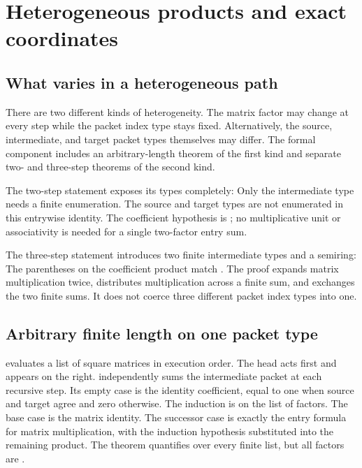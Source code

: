 \clearpage
\section{Heterogeneous products and exact coordinates}
\subsection{What varies in a heterogeneous path}
There are two different kinds of heterogeneity. The matrix factor may change at every step while the packet index type stays fixed. Alternatively, the source, intermediate, and target packet types themselves may differ. The formal component includes an arbitrary-length theorem of the first kind and separate two- and three-step theorems of the second kind.

The two-step statement exposes its types completely:
Only the intermediate type  needs a finite enumeration. The source and target types are not enumerated in this entrywise identity. The coefficient hypothesis is ; no multiplicative unit or associativity is needed for a single two-factor entry sum.

The three-step statement introduces two finite intermediate types and a semiring:
The parentheses on the coefficient product match . The proof expands matrix multiplication twice, distributes multiplication across a finite sum, and exchanges the two finite sums. It does not coerce three different packet index types into one.

\subsection{Arbitrary finite length on one packet type}
 evaluates a list of square matrices in execution order. The head acts first and appears on the right.  independently sums the intermediate packet at each recursive step. Its empty case is the identity coefficient, equal to one when source and target agree and zero otherwise.
The induction is on the list of factors. The base case is the matrix identity. The successor case is exactly the entry formula for matrix multiplication, with the induction hypothesis substituted into the remaining product. The theorem quantifies over every finite list, but all factors are .

